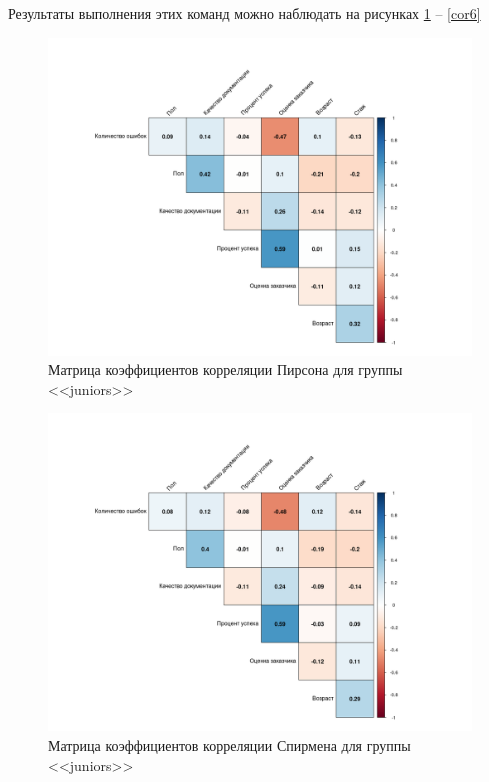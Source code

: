 Результаты выполнения этих команд можно наблюдать на рисунках \ref{cor1} -- \ref{cor6}

\begin{figure}[H]
	\centering
	\includegraphics[width=\linewidth]{cor1}
	\caption{Матрица коэффициентов корреляции Пирсона для группы <<juniors>>}
	\label{cor1}
\end{figure}

\begin{figure}[H]
	\centering
	\includegraphics[width=\linewidth]{cor2}
	\caption{Матрица коэффициентов корреляции Спирмена для группы <<juniors>>}
	\label{cor2}
\end{figure}

